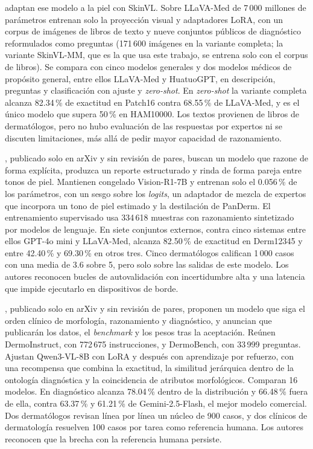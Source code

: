 \textcite{zeng2025mmskin} adaptan ese modelo a la piel con SkinVL. Sobre LLaVA-Med de 7\,000 millones de parámetros
entrenan solo la proyección visual y adaptadores LoRA, con un corpus de imágenes de libros de texto y nueve conjuntos
públicos de diagnóstico reformulados como preguntas (171\,600 imágenes en la variante completa; la variante SkinVL-MM,
que es la que usa este trabajo, se entrena solo con el corpus de libros). Se compara con cinco
modelos generales y dos modelos médicos de propósito general, entre ellos LLaVA-Med y HuatuoGPT, en descripción, preguntas y
clasificación con ajuste y \emph{zero-shot}. En \emph{zero-shot} la variante completa alcanza 82.34\,\% de exactitud en
Patch16 contra 68.55\,\% de LLaVA-Med, y es el único modelo que supera 50\,\% en HAM10000. Los textos provienen de
libros de dermatólogos, pero no hubo evaluación de las respuestas por expertos ni se discuten limitaciones, más allá de
pedir mayor capacidad de razonamiento.

\textcite{shen2025skingptr1}, publicado solo en arXiv y sin revisión de pares, buscan un modelo que razone de forma
explícita, produzca un reporte estructurado y rinda de forma pareja entre tonos de piel. Mantienen congelado
Vision-R1-7B y entrenan solo el 0.056\,\% de los parámetros, con un sesgo sobre los \emph{logits}, un adaptador de
mezcla de expertos que incorpora un tono de piel estimado y la destilación de PanDerm. El entrenamiento supervisado usa
334\,618 muestras con razonamiento sintetizado por modelos de lenguaje. En siete conjuntos externos, contra cinco
sistemas entre ellos GPT-4o mini y LLaVA-Med, alcanza 82.50\,\% de exactitud en Derm12345 y entre 42.40\,\% y
69.30\,\% en otros tres. Cinco dermatólogos califican 1\,000 casos con una media de 3.6 sobre 5, pero solo sobre las
salidas de este modelo. Los autores reconocen bucles de autovalidación con incertidumbre alta y una latencia que impide
ejecutarlo en dispositivos de borde.

\textcite{ru2026dermogpt}, publicado solo en arXiv y sin revisión de pares, proponen un modelo que siga el orden
clínico de morfología, razonamiento y diagnóstico, y anuncian que publicarán los datos, el \emph{benchmark} y los
pesos tras la aceptación. Reúnen DermoInstruct,
con 772\,675 instrucciones, y DermoBench, con 33\,999 preguntas. Ajustan Qwen3-VL-8B con LoRA y después con aprendizaje
por refuerzo, con una recompensa que combina la exactitud, la similitud jerárquica dentro de la ontología diagnóstica y
la coincidencia de atributos morfológicos. Comparan 16 modelos. En diagnóstico alcanza 78.04\,\% dentro de la
distribución y 66.48\,\% fuera de ella, contra 63.37\,\% y 61.21\,\% de Gemini-2.5-Flash, el mejor modelo comercial.
Dos dermatólogos revisan línea por línea un núcleo de 900 casos, y dos clínicos de dermatología resuelven 100 casos
por tarea como referencia humana. Los autores reconocen que la
brecha con la referencia humana persiste.

